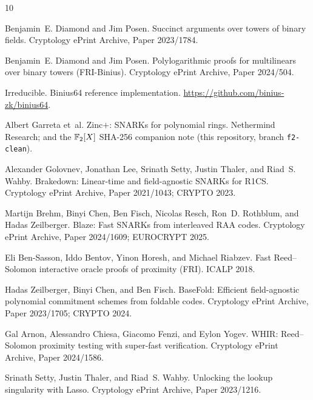 \begin{thebibliography}{10}

Benjamin~E. Diamond and Jim Posen.
\newblock Succinct arguments over towers of binary fields.
\newblock Cryptology ePrint Archive, Paper 2023/1784.

Benjamin~E. Diamond and Jim Posen.
\newblock Polylogarithmic proofs for multilinears over binary towers
  (FRI-Binius).
\newblock Cryptology ePrint Archive, Paper 2024/504.

Irreducible.
\newblock Binius64 reference implementation.
\newblock \url{https://github.com/binius-zk/binius64}.

Albert Garreta et~al.
\newblock Zinc$+$: SNARKs for polynomial rings.
\newblock Nethermind Research; and the $\mathbb{F}_2[X]$ SHA-256 companion note
  (this repository, branch \texttt{f2-clean}).

Alexander Golovnev, Jonathan Lee, Srinath Setty, Justin Thaler, and
  Riad~S. Wahby.
\newblock Brakedown: Linear-time and field-agnostic SNARKs for R1CS.
\newblock Cryptology ePrint Archive, Paper 2021/1043; CRYPTO 2023.

Martijn Brehm, Binyi Chen, Ben Fisch, Nicolas Resch, Ron~D. Rothblum, and
  Hadas Zeilberger.
\newblock Blaze: Fast SNARKs from interleaved RAA codes.
\newblock Cryptology ePrint Archive, Paper 2024/1609; EUROCRYPT 2025.

Eli Ben-Sasson, Iddo Bentov, Yinon Horesh, and Michael Riabzev.
\newblock Fast Reed--Solomon interactive oracle proofs of proximity (FRI).
\newblock ICALP 2018.

Hadas Zeilberger, Binyi Chen, and Ben Fisch.
\newblock BaseFold: Efficient field-agnostic polynomial commitment schemes
  from foldable codes.
\newblock Cryptology ePrint Archive, Paper 2023/1705; CRYPTO 2024.

Gal Arnon, Alessandro Chiesa, Giacomo Fenzi, and Eylon Yogev.
\newblock WHIR: Reed--Solomon proximity testing with super-fast
  verification.
\newblock Cryptology ePrint Archive, Paper 2024/1586.

Srinath Setty, Justin Thaler, and Riad~S. Wahby.
\newblock Unlocking the lookup singularity with Lasso.
\newblock Cryptology ePrint Archive, Paper 2023/1216.

\end{thebibliography}
